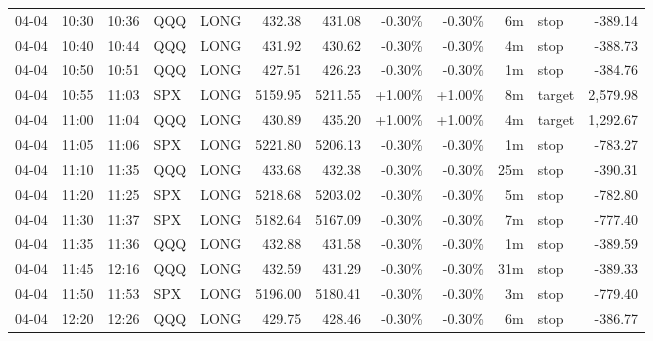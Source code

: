 \documentclass[11pt,a4paper,twoside]{article}
\begin{document}
\begin{center}
\begin{longtable}{>{\color{txtmain}}l l l l l r r r r r >{\color{txtmain}}l r}
04-04 & 10:30 & 10:36 & QQQ & LONG & 432.38 & 431.08 & \textcolor{lossred}{-0.30\%} & \textcolor{lossred}{-0.30\%} & 6m & stop & \textcolor{lossred}{-389.14} \\
04-04 & 10:40 & 10:44 & QQQ & LONG & 431.92 & 430.62 & \textcolor{lossred}{-0.30\%} & \textcolor{lossred}{-0.30\%} & 4m & stop & \textcolor{lossred}{-388.73} \\
04-04 & 10:50 & 10:51 & QQQ & LONG & 427.51 & 426.23 & \textcolor{lossred}{-0.30\%} & \textcolor{lossred}{-0.30\%} & 1m & stop & \textcolor{lossred}{-384.76} \\
04-04 & 10:55 & 11:03 & SPX & LONG & 5159.95 & 5211.55 & \textcolor{wingreen}{+1.00\%} & \textcolor{wingreen}{+1.00\%} & 8m & target & \textcolor{wingreen}{2,579.98} \\
04-04 & 11:00 & 11:04 & QQQ & LONG & 430.89 & 435.20 & \textcolor{wingreen}{+1.00\%} & \textcolor{wingreen}{+1.00\%} & 4m & target & \textcolor{wingreen}{1,292.67} \\
04-04 & 11:05 & 11:06 & SPX & LONG & 5221.80 & 5206.13 & \textcolor{lossred}{-0.30\%} & \textcolor{lossred}{-0.30\%} & 1m & stop & \textcolor{lossred}{-783.27} \\
04-04 & 11:10 & 11:35 & QQQ & LONG & 433.68 & 432.38 & \textcolor{lossred}{-0.30\%} & \textcolor{lossred}{-0.30\%} & 25m & stop & \textcolor{lossred}{-390.31} \\
04-04 & 11:20 & 11:25 & SPX & LONG & 5218.68 & 5203.02 & \textcolor{lossred}{-0.30\%} & \textcolor{lossred}{-0.30\%} & 5m & stop & \textcolor{lossred}{-782.80} \\
04-04 & 11:30 & 11:37 & SPX & LONG & 5182.64 & 5167.09 & \textcolor{lossred}{-0.30\%} & \textcolor{lossred}{-0.30\%} & 7m & stop & \textcolor{lossred}{-777.40} \\
04-04 & 11:35 & 11:36 & QQQ & LONG & 432.88 & 431.58 & \textcolor{lossred}{-0.30\%} & \textcolor{lossred}{-0.30\%} & 1m & stop & \textcolor{lossred}{-389.59} \\
04-04 & 11:45 & 12:16 & QQQ & LONG & 432.59 & 431.29 & \textcolor{lossred}{-0.30\%} & \textcolor{lossred}{-0.30\%} & 31m & stop & \textcolor{lossred}{-389.33} \\
04-04 & 11:50 & 11:53 & SPX & LONG & 5196.00 & 5180.41 & \textcolor{lossred}{-0.30\%} & \textcolor{lossred}{-0.30\%} & 3m & stop & \textcolor{lossred}{-779.40} \\
04-04 & 12:20 & 12:26 & QQQ & LONG & 429.75 & 428.46 & \textcolor{lossred}{-0.30\%} & \textcolor{lossred}{-0.30\%} & 6m & stop & \textcolor{lossred}{-386.77} \\

\end{longtable}
\end{center}
\end{document}
